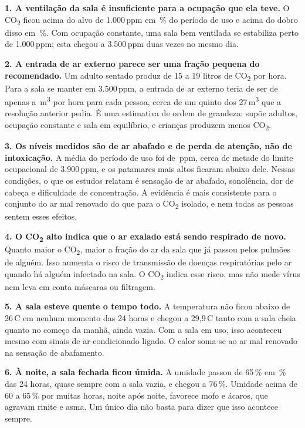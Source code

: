 \documentclass[11pt,a4paper]{article}
\newcommand{\cod}{CO\textsubscript{2}}
\newcommand{\grau}{\,\textdegree C}
\begin{document}
\begin{destaque}
\textbf{1. A ventilação da sala é insuficiente para a ocupação que ela teve.} O \cod{} ficou acima do alvo de 1.000\,ppm em \PctUsoAcimaMil\,\% do período de uso e acima do dobro disso em \PctUsoAcimaDoisMil\,\%. Com ocupação constante, uma sala bem ventilada se estabiliza perto de 1.000\,ppm; esta chegou a 3.500\,ppm duas vezes no mesmo dia.
\end{destaque}

\textbf{2. A entrada de ar externo parece ser uma fração pequena do recomendado.} Um adulto sentado produz de 15 a 19 litros de \cod{} por hora. Para a sala se manter em 3.500\,ppm, a entrada de ar externo teria de ser de apenas \VazaoQuinze{} a \VazaoDezenove\,m\textsuperscript{3} por hora para cada pessoa, cerca de um quinto dos 27\,m\textsuperscript{3} que a resolução anterior pedia. É uma estimativa de ordem de grandeza: supõe adultos, ocupação constante e sala em equilíbrio, e crianças produzem menos \cod{}.

\textbf{3. Os níveis medidos são de ar abafado e de perda de atenção, não de intoxicação.} A média do período de uso foi de \CoUsoMed\,ppm, cerca de metade do limite ocupacional de 3.900\,ppm, e os patamares mais altos ficaram abaixo dele. Nessas condições, o que os estudos relatam é sensação de ar abafado, sonolência, dor de cabeça e dificuldade de concentração. A evidência é mais consistente para o conjunto do ar mal renovado do que para o \cod{} isolado, e nem todas as pessoas sentem esses efeitos.

\textbf{4. O \cod{} alto indica que o ar exalado está sendo respirado de novo.} Quanto maior o \cod{}, maior a fração do ar da sala que já passou pelos pulmões de alguém. Isso aumenta o risco de transmissão de doenças respiratórias pelo ar quando há alguém infectado na sala. O \cod{} indica esse risco, mas não mede vírus nem leva em conta máscaras ou filtragem.

\textbf{5. A sala esteve quente o tempo todo.} A temperatura não ficou abaixo de 26\grau{} em nenhum momento das 24 horas e chegou a 29,9\grau{} tanto com a sala cheia quanto no começo da manhã, ainda vazia. Com a sala em uso, isso aconteceu mesmo com sinais de ar-condicionado ligado. O calor soma-se ao ar mal renovado na sensação de abafamento.

\textbf{6. À noite, a sala fechada ficou úmida.} A umidade passou de 65\,\% em \UmidAcimaSessentaCinco\,\% das 24 horas, quase sempre com a sala vazia, e chegou a 76\,\%. Umidade acima de 60 a 65\,\% por muitas horas, noite após noite, favorece mofo e ácaros, que agravam rinite e asma. Um único dia não basta para dizer que isso acontece sempre.
\end{document}
